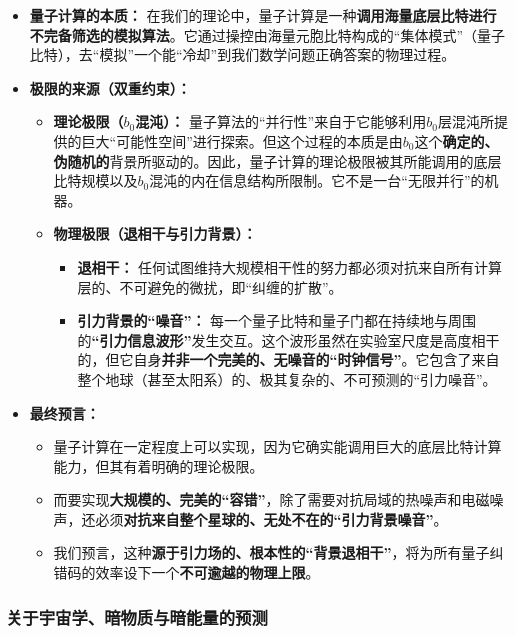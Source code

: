 \documentclass[11pt, a4paper]{article}
\begin{document}
\begin{enumerate}
    \begin{itemize}
        \item \textbf{量子计算的本质：} 在我们的理论中，量子计算是一种\textbf{调用海量底层比特进行不完备筛选的模拟算法}。它通过操控由海量元胞比特构成的“集体模式”（量子比特），去“模拟”一个能“冷却”到我们数学问题正确答案的物理过程。
        \item \textbf{极限的来源（双重约束）：}
        \begin{itemize}
            \item \textbf{理论极限（$b_0$混沌）：} 量子算法的“并行性”来自于它能够利用$b_0$层混沌所提供的巨大“可能性空间”进行探索。但这个过程的本质是由$b_0$这个\textbf{确定的、伪随机的}背景所驱动的。因此，量子计算的理论极限被其所能调用的底层比特规模以及$b_0$混沌的内在信息结构所限制。它不是一台“无限并行”的机器。
            \item \textbf{物理极限（退相干与引力背景）：}
            \begin{itemize}
                \item \textbf{退相干：} 任何试图维持大规模相干性的努力都必须对抗来自所有计算层的、不可避免的微扰，即“纠缠的扩散”。
                \item \textbf{引力背景的“噪音”：} 每一个量子比特和量子门都在持续地与周围的\textbf{“引力信息波形”}发生交互。这个波形虽然在实验室尺度是高度相干的，但它自身\textbf{并非一个完美的、无噪音的“时钟信号”}。它包含了来自整个地球（甚至太阳系）的、极其复杂的、不可预测的“引力噪音”。
            \end{itemize}
        \end{itemize}
        \item \textbf{最终预言：}
        \begin{itemize}
            \item 量子计算在一定程度上可以实现，因为它确实能调用巨大的底层比特计算能力，但其有着明确的理论极限。
            \item 而要实现\textbf{大规模的、完美的“容错”}，除了需要对抗局域的热噪声和电磁噪声，还必须\textbf{对抗来自整个星球的、无处不在的“引力背景噪音”}。
            \item 我们预言，这种\textbf{源于引力场的、根本性的“背景退相干”}，将为所有量子纠错码的效率设下一个\textbf{不可逾越的物理上限}。
        \end{itemize}
    \end{itemize}
\end{enumerate}

\subsubsection{关于宇宙学、暗物质与暗能量的预测}
\end{document}
